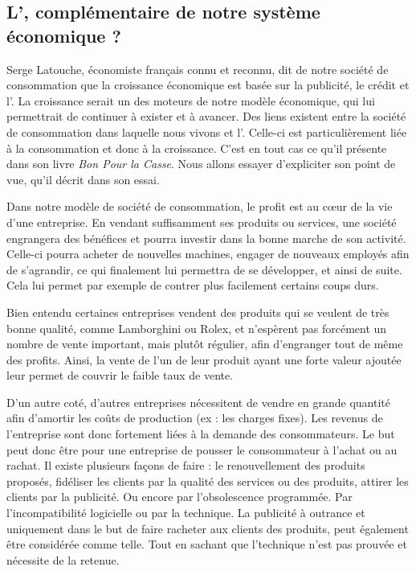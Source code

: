 \subsection{L'\OP, complémentaire de notre système économique ?}

Serge Latouche, économiste français connu et reconnu, dit de notre société de consommation que la croissance économique est basée sur la publicité, le crédit et l'\op. La croissance serait un des moteurs de notre modèle économique, qui lui permettrait de continuer à exister et à avancer. Des liens existent entre la société de consommation dans laquelle nous vivons et l'\op. Celle-ci est particulièrement liée à la consommation et donc à la croissance. C'est en tout cas ce qu'il présente dans son livre \textit{Bon Pour la Casse}. Nous allons essayer d'expliciter son point de vue, qu'il décrit dans son essai.

\bigbreak
Dans notre modèle de société de consommation, le profit est au cœur de la vie d'une entreprise. En vendant suffisamment ses produits ou services, une société engrangera des bénéfices et pourra investir dans la bonne marche de son activité. Celle-ci pourra acheter de nouvelles machines, engager de nouveaux employés afin de s'agrandir, ce qui finalement lui permettra de se développer, et ainsi de suite. Cela lui permet par exemple de contrer plus facilement certains coups durs.

Bien entendu certaines entreprises vendent des produits qui se veulent de très bonne qualité, comme Lamborghini ou Rolex, et n'espèrent pas forcément un nombre de vente important, mais plutôt régulier, afin d'engranger tout de même des profits. Ainsi, la vente de l'un de leur produit ayant une forte valeur ajoutée leur permet de couvrir le faible taux de vente.

D'un autre coté, d'autres entreprises nécessitent de vendre en grande quantité afin d'amortir les coûts de production (ex : les charges fixes). Les revenus de l'entreprise sont donc fortement liées à la demande des consommateurs. Le but peut donc être pour une entreprise de pousser le consommateur à l'achat ou au rachat. Il existe plusieurs façons de faire :  le renouvellement des produits proposés, fidéliser les clients par la qualité des services ou des produits, attirer les clients par la publicité. Ou encore par l'obsolescence programmée. Par l'incompatibilité logicielle ou par la technique. La publicité à outrance et uniquement dans le but de faire racheter aux clients des produits, peut également être considérée comme telle. Tout en sachant que l'\op technique n'est pas prouvée et nécessite de la retenue.

